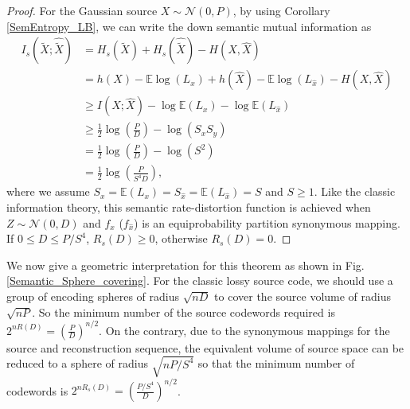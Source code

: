 \documentclass[12pt, draftclsnofoot,onecolumn]{IEEEtran}
\begin{document}
\begin{proof}
For the Gaussian source $X\sim \mathcal{N}(0,P)$, by using Corollary \ref{SemEntropy_LB}, we can write the down semantic mutual information as
\begin{equation}
\begin{aligned}
I_s(\tilde{X};\hat{\tilde{X}})&= H_s(\tilde{X})+H_s(\hat{\tilde{X}})-H(X,\hat{X}) \\
                                            &= h(X)-\mathbb{E}\log(L_x)+h(\hat{X})- \mathbb{E}\log(L_{\hat{x}})-H(X,\hat{X})   \\
                                            &\geq I(X;\hat{X})-\log\mathbb{E}(L_x)-\log\mathbb{E}(L_{\hat{x}})  \\
                                            &\geq\frac{1}{2}\log\left(\frac{P}{D}\right)-\log(S_xS_y)\\
                                            &= \frac{1}{2}\log\left(\frac{P}{D}\right)-\log(S^2)\\
                                            &= \frac{1}{2}\log\left(\frac{P}{S^4 D}\right),
\end{aligned}
\end{equation}
where we assume $S_x=\mathbb{E}(L_x)=S_{\hat{x}}=\mathbb{E}(L_{\hat{x}}) =S$ and $S\geq 1$. Like the classic information theory, this semantic rate-distortion function is achieved when $Z\sim \mathcal{N}(0,D)$ and $f_{x}$ ($f_{\hat{x}}$) is an equiprobability partition synonymous mapping. If $0\leq D \leq  P/S^4$, $R_s(D)\geq 0$, otherwise $R_s(D)=0$.
\end{proof}

We now give a geometric interpretation for this theorem as shown in Fig. \ref{Semantic_Sphere_covering}. For the classic lossy source code, we should use a group of encoding spheres of radius $\sqrt{nD}$ to cover the source volume of radius $\sqrt{nP}$. So the minimum number of the source codewords required is $2^{nR(D)}=\left(\frac{P}{D}\right)^{n/2}$. On the contrary, due to the synonymous mappings for the source and reconstruction sequence, the equivalent volume of source space can be reduced to a sphere of radius $\sqrt{nP/S^4}$ so that the minimum number of codewords is $2^{nR_s(D)}=\left(\frac{P/S^4}{D}\right)^{n/2}$.
\end{document}
